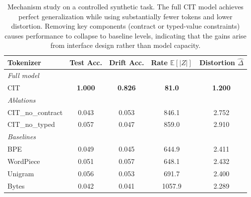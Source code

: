 \begin{table}[t]
\centering
\small
\setlength{\tabcolsep}{4pt}
\begin{tabular*}{\columnwidth}{@{\extracolsep{\fill}}lcccc@{}}
\toprule
Tokenizer & Test Acc. & Drift Acc. & Rate $\mathbb{E}[|Z|]$ & Distortion $\hat{\Delta}$ \\
\midrule
\multicolumn{5}{l}{\textit{Full model}}\\
CIT & \textbf{1.000} & \textbf{0.826} & \textbf{81.0} & \textbf{1.200} \\
\midrule
\multicolumn{5}{l}{\textit{Ablations}}\\
CIT\_no\_contract & 0.043 & 0.053 & 846.1 & 2.752 \\
CIT\_no\_typed    & 0.057 & 0.047 & 859.0 & 2.910 \\
\midrule
\multicolumn{5}{l}{\textit{Baselines}}\\
BPE       & 0.049 & 0.045 & 644.9 & 2.411 \\
WordPiece & 0.051 & 0.057 & 648.1 & 2.432 \\
Unigram   & 0.056 & 0.053 & 691.7 & 2.400 \\
Bytes     & 0.042 & 0.041 & 1057.9 & 2.289 \\
\bottomrule
\end{tabular*}
\caption{Mechanism study on a controlled synthetic task. The full CIT model achieves perfect generalization while using substantially fewer tokens and lower distortion. Removing key components (contract or typed-value constraints) causes performance to collapse to baseline levels, indicating that the gains arise from interface design rather than model capacity.}
\label{tab:e1_synth}
\end{table}
